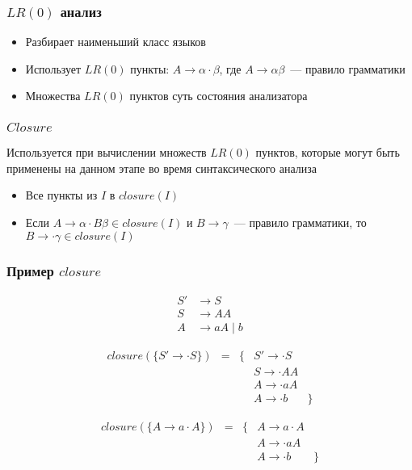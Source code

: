 \documentclass{beamer}
\newcommand{\lritem}[3]{#1 \to #2 \cdot #3}
\begin{document}
\begin{frame}[fragile]
  \transwipe[direction=90]
  \frametitle{$LR(0)$ анализ}

  \begin{itemize}
    \item Разбирает наименьший класс языков 
    \item Использует $LR(0)$ пункты: $\lritem{A}{\alpha}{\beta}$, где $A \to \alpha \beta$~--- правило грамматики 
    \item Множества $LR(0)$ пунктов суть состояния анализатора
  \end{itemize}

\end{frame}

\begin{frame}[fragile]
  \transwipe[direction=90]
  \frametitle{$Closure$}
  Используется при вычислении множеств $LR(0)$ пунктов, которые могут быть применены на данном этапе во время синтаксического анализа

  \begin{itemize}
    \item Все пункты из $I$ в $closure(I)$
    \item Если $\lritem{A}{\alpha}{B \beta} \in closure(I) \text{ и } B \to \gamma$~--- правило грамматики, то
    $\lritem{B}{}{\gamma} \in closure(I)$
  \end{itemize}
\end{frame}

\begin{frame}[fragile]
  \transwipe[direction=90]
  \frametitle{Пример $closure$}
  
  \begin{align*}
    S' &\to S \\ 
    S  &\to A A \\ 
    A  &\to a A \mid b 
  \end{align*}

  \[
  \begin{array}{rcclr}
    closure(\{\lritem{S'}{}{S}\}) & = & \{ &\lritem{S'}{}{S} & \\
                                  &   &    &\lritem{S}{}{AA} & \\ 
                                  &   &    &\lritem{A}{}{aA} & \\ 
                                  &   &    &\lritem{A}{}{b}  &\}
  \end{array}  
  \]

  \[
  \begin{array}{rcclr}
    closure(\{\lritem{A}{a}{A}\}) & = & \{ & \lritem{A}{a}{A} & \\ 
                                  &   &    & \lritem{A}{}{aA} & \\ 
                                  &   &    & \lritem{A}{}{b}  & \}
  \end{array}
  \]

\end{frame}
\end{document}

